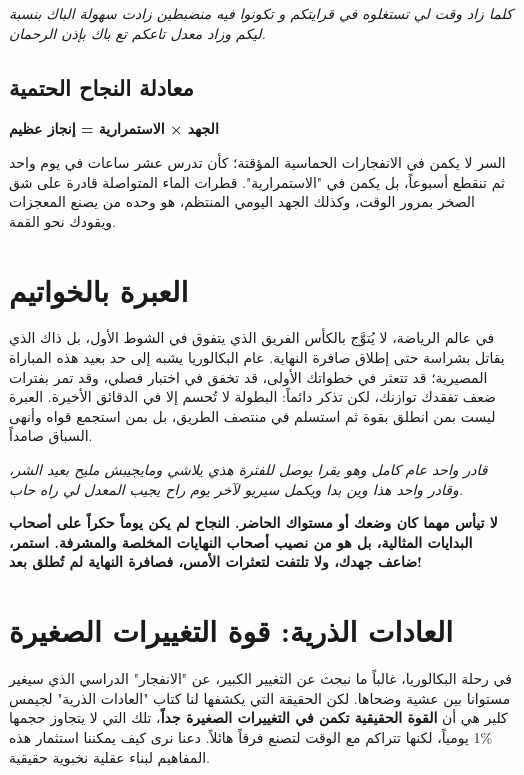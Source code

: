\documentclass[12pt,a4paper]{book}
\newcommand{\quoteAr}[1]{%
	\begin{myquote}
		\itshape #1
	\end{myquote}
}
\newcommand{\importantAr}[1]{%
	\begin{important}
		\bfseries #1
	\end{important}
}
\begin{document}
	\quoteAr{كلما زاد وقت لي تستغلوه في قرايتكم و تكونوا فيه منضبطين زادت سهولة الباك بنسبة ليكم وزاد معدل تاعكم تع باك بإذن الرحمان.}
	
	\subsection*{معادلة النجاح الحتمية}
	\begin{center}
		\Large
		\textbf{الجهد × الاستمرارية = إنجاز عظيم}
	\end{center}
	
	السر لا يكمن في الانفجارات الحماسية المؤقتة؛ كأن تدرس عشر ساعات في يوم واحد ثم تنقطع أسبوعاً، بل يكمن في "الاستمرارية". قطرات الماء المتواصلة قادرة على شق الصخر بمرور الوقت، وكذلك الجهد اليومي المنتظم، هو وحده من يصنع المعجزات ويقودك نحو القمة.
\section{العبرة بالخواتيم}

في عالم الرياضة، لا يُتوَّج بالكأس الفريق الذي يتفوق في الشوط الأول، بل ذاك الذي يقاتل بشراسة حتى إطلاق صافرة النهاية. عام البكالوريا يشبه إلى حد بعيد هذه المباراة المصيرية؛ قد تتعثر في خطواتك الأولى، قد تخفق في اختبار فصلي، وقد تمر بفترات ضعف تفقدك توازنك، لكن تذكر دائماً: البطولة لا تُحسم إلا في الدقائق الأخيرة. العبرة ليست بمن انطلق بقوة ثم استسلم في منتصف الطريق، بل بمن استجمع قواه وأنهى السباق صامداً.

\quoteAr{قادر واحد عام كامل وهو يقرا يوصل للفترة هذي يلاشي ومايجيبش مليح بعيد الشر، وقادر واحد هذا وين بدا ويكمل سيريو لآخر يوم راح يجيب المعدل لي راه حاب.}
\importantAr{لا تيأس مهما كان وضعك أو مستواك الحاضر. النجاح لم يكن يوماً حكراً على أصحاب البدايات المثالية، بل هو من نصيب أصحاب النهايات المخلصة والمشرفة. استمر، ضاعف جهدك، ولا تلتفت لتعثرات الأمس، فصافرة النهاية لم تُطلق بعد!}
	
	
	
	\section{ العادات الذرية: قوة التغييرات الصغيرة}
\label{sec:owner-experiences3}
	
	في رحلة البكالوريا، غالباً ما نبحث عن التغيير الكبير، عن "الانفجار" الدراسي الذي سيغير مستوانا بين عشية وضحاها. لكن الحقيقة التي يكشفها لنا كتاب "العادات الذرية" لجيمس كلير هي أن \textbf{القوة الحقيقية تكمن في التغييرات الصغيرة جداً}، تلك التي لا يتجاوز حجمها \%1 يومياً، لكنها تتراكم مع الوقت لتصنع فرقاً هائلاً. دعنا نرى كيف يمكننا استثمار هذه المفاهيم لبناء عقلية نخبوية حقيقية.
	
\end{document}
